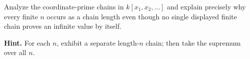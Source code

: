\begin{problem}\label{chal:vi29-05}
Analyze the coordinate-prime chains in $k[x_1,x_2,\ldots]$ and explain precisely why every finite $n$ occurs as a chain length even though no single displayed finite chain proves an infinite value by itself.

\textbf{Hint.} For each $n$, exhibit a separate length-$n$ chain; then take the supremum over all $n$.
\end{problem}
